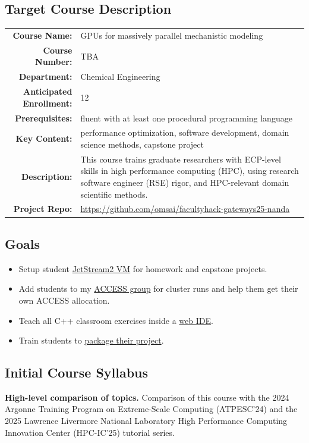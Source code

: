 \documentclass{article}
\newcommand{\sectionbox}[1]{%
  \begin{tcolorbox}[sharp corners,boxrule=0pt,top=15pt,colback=fh-blue,coltext=fh-gold]%
    \section*{#1\vphantom{Yy}}%
  \end{tcolorbox}%
}
\begin{document}
\begin{multicols}{2}
  \subsection*{\textcolor{fh-blue}{Target Course Description}}

  {
    \begin{tabularx}{\linewidth}{>{\bfseries}r X}
      \toprule
      Course Name:
      & GPUs for massively parallel mechanistic modeling\\
      Course Number:
      & TBA\\
      Department:
      & Chemical Engineering\\
      Anticipated Enrollment:
      & 12\\
      Prerequisites:
      & fluent with at least one %
      procedural programming language\\
      Key Content:
      & performance optimization, %
      software development, %
      domain science methods, %
      capstone project\\
      Description:
      & This course trains graduate researchers %
      with ECP-level skills in high performance computing (HPC), %
      using research software engineer (RSE) rigor, %
      and HPC-relevant domain scientific methods.\\
      Project Repo:
      & \small \url{https://github.com/omsai/facultyhack-gateways25-nanda}\\
      \bottomrule
    \end{tabularx}
  }

  \subsection*{\textcolor{fh-blue}{Goals}}
  \begin{itemize}
  \item Setup student \ul{JetStream2 VM} for homework and capstone projects.
  \item Add students to my \ul{ACCESS group} for cluster runs and %
    help them get their own ACCESS allocation.
  \item Teach all C++ classroom exercises inside a \ul{web IDE}. 
  \item Train students to \ul{package their project}.
  \end{itemize}

  \sectionbox{Initial Course Syllabus}%
  \noindent
    \textbf{High-level comparison of topics.}
        Comparison of this course with the %
        2024 Argonne Training Program on Extreme-Scale Computing (ATPESC'24) %
        and the 2025 Lawrence Livermore National Laboratory %
        High Performance Computing Innovation Center (HPC-IC'25) %
        tutorial series.
        \medskip


\end{multicols}
\end{document}
